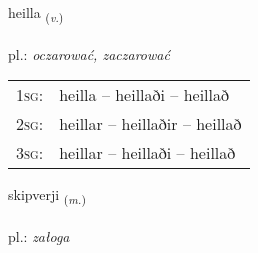 \documentclass[frontgrid, backgrid]{flacards}\usepackage[]{graphicx}\usepackage[]{xcolor}
\begin{document}
\renewcommand{\blhead}{\vskip5pt {\small\bfseries\footnotesize Sagnorð | czasownik }}
\renewcommand{\bcfoot}{\vskip5pt \hspace{2pt}{\small\bfseries\footnotesize 3K}}


{heilla \small{\textsubscript{(\textit{v.})}} \\[1ex] %
\textphonetic{[heitla]} \\
pl.: \emph{oczarować, zaczarować} \\  [2ex]
\renewcommand*{\arraystretch}{0.8}
\begin{tabular}{p{1cm}l}
\textsc{1sg}: & heilla -- heillaði -- heillað \\ 
\textsc{2sg}: & heillar -- heillaðir -- heillað \\ 
\textsc{3sg}: & heillar -- heillaði -- heillað \\ 
\end{tabular}
}

\renewcommand{\flhead}{\vskip5pt \fboxsep=0pt {\small\bfseries\footnotesize Nafnorð | rzeczownik}}
\renewcommand{\fcfoot}{\vskip5pt \fboxsep=0pt \hspace{2pt}{\small\bfseries\footnotesize 3K}}

\renewcommand{\blhead}{\vskip5pt {\small\bfseries\footnotesize Nafnorð | rzeczownik }}
\renewcommand{\bcfoot}{\vskip5pt \hspace{2pt}{\small\bfseries\footnotesize 3K}}


{skipverji \small{\textsubscript{(\textit{m.})}} \\[1ex] %
\textphonetic{[scɪːpvɛrjɪ]} \\
pl.: \emph{załoga} \\  [2ex]
\renewcommand*{\arraystretch}{0.8}
}
\end{document}
